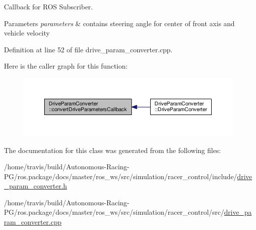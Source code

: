 Callback for R\+OS Subscriber. 


\begin{DoxyParams}{Parameters}
{\em parameters} & contains steering angle for center of front axis and vehicle velocity \\
\hline
\end{DoxyParams}


Definition at line 52 of file drive\+\_\+param\+\_\+converter.\+cpp.



Here is the caller graph for this function\+:
\nopagebreak
\begin{figure}[H]
\begin{center}
\leavevmode
\includegraphics[width=350pt]{class_drive_param_converter_aa101cfe15a7358f7816f9d6a14fd4261_icgraph}
\end{center}
\end{figure}




The documentation for this class was generated from the following files\+:\begin{DoxyCompactItemize}
\item 
/home/travis/build/\+Autonomous-\/\+Racing-\/\+P\+G/ros.\+package/docs/master/ros\+\_\+ws/src/simulation/racer\+\_\+control/include/\hyperlink{drive__param__converter_8h}{drive\+\_\+param\+\_\+converter.\+h}\item 
/home/travis/build/\+Autonomous-\/\+Racing-\/\+P\+G/ros.\+package/docs/master/ros\+\_\+ws/src/simulation/racer\+\_\+control/src/\hyperlink{drive__param__converter_8cpp}{drive\+\_\+param\+\_\+converter.\+cpp}\end{DoxyCompactItemize}
